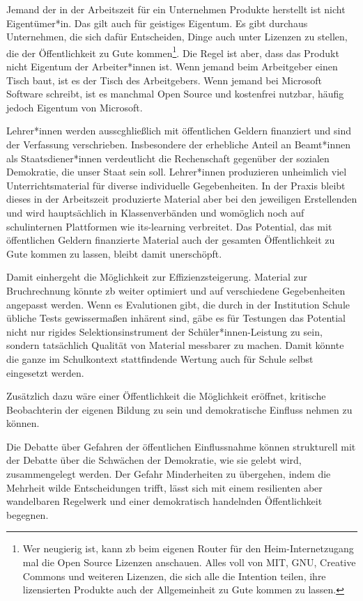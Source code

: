Jemand der in der Arbeitszeit für ein Unternehmen Produkte herstellt ist nicht Eigentümer*in. Das gilt auch für geistiges Eigentum. Es gibt durchaus Unternehmen, die sich dafür Entscheiden, Dinge auch unter Lizenzen zu stellen, die der Öffentlichkeit zu Gute kommen\footnote{
    Wer neugierig ist, kann \gls{zb} beim eigenen Router für den Heim-Internetzugang mal die Open Source Lizenzen anschauen. Alles voll von MIT, GNU, Creative Commons und weiteren Lizenzen, die sich alle die Intention teilen, ihre lizensierten Produkte auch der Allgemeinheit zu Gute kommen zu lassen.
}. Die Regel ist aber, dass das Produkt nicht Eigentum der Arbeiter*innen ist. Wenn jemand beim Arbeitgeber einen Tisch baut, ist es der Tisch des Arbeitgebers. Wenn jemand bei Microsoft Software schreibt, ist es manchmal Open Source und kostenfrei nutzbar, häufig jedoch Eigentum von Microsoft.

Lehrer*innen werden ausscghließlich mit öffentlichen Geldern finanziert und sind der Verfassung verschrieben. Insbesondere der erhebliche Anteil an Beamt*innen als Staatsdiener*innen verdeutlicht die Rechenschaft gegenüber der sozialen Demokratie, die unser Staat sein soll. 
Lehrer*innen produzieren unheimlich viel Unterrichtsmaterial für diverse individuelle Gegebenheiten. In der Praxis bleibt dieses in der Arbeitszeit produzierte Material aber bei den jeweiligen Erstellenden und wird hauptsächlich in Klassenverbänden und womöglich noch auf schulinternen Plattformen wie its-learning verbreitet. 
Das Potential, das mit öffentlichen Geldern finanzierte Material auch der gesamten Öffentlichkeit zu Gute kommen zu lassen, bleibt damit unerschöpft.

Damit einhergeht die Möglichkeit zur Effizienzsteigerung. Material zur Bruchrechnung könnte \gls{zb} weiter optimiert und auf verschiedene Gegebenheiten angepasst werden. Wenn es Evalutionen gibt, die durch in der Institution Schule übliche Tests gewissermaßen inhärent sind, gäbe es für Testungen das Potential nicht nur rigides Selektionsinstrument der Schüler*innen-Leistung zu sein, sondern tatsächlich Qualität von Material messbarer zu machen. Damit könnte die ganze im Schulkontext stattfindende Wertung auch für Schule selbst eingesetzt werden. 

Zusätzlich dazu wäre einer Öffentlichkeit die Möglichkeit eröffnet, kritische Beobachterin der eigenen Bildung zu sein und demokratische Einfluss nehmen zu können. 

Die Debatte über Gefahren der öffentlichen Einflussnahme können strukturell mit der Debatte über die Schwächen der Demokratie, wie sie gelebt wird, zusammengelegt werden. Der Gefahr Minderheiten zu übergehen, indem die Mehrheit wilde Entscheidungen trifft,  
lässt sich mit einem resilienten aber wandelbaren Regelwerk und einer demokratisch handelnden Öffentlichkeit begegnen.

